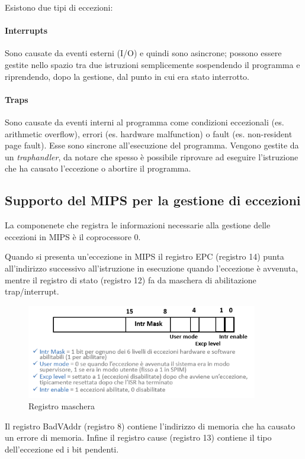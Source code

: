 \documentclass[class=book, crop=false, oneside]{standalone}
\begin{document}
Esistono due tipi di eccezioni:
\paragraph{Interrupts} Sono causate da eventi esterni (I/O) e quindi sono asincrone; possono essere gestite nello spazio tra due istruzioni semplicemente sospendendo il programma e riprendendo, dopo la gestione, dal punto in cui era stato interrotto.
\paragraph{Traps} Sono causate da eventi interni al programma come condizioni eccezionali (es. arithmetic overflow), errori (es. hardware malfunction) o fault (es. non-resident page fault).
Esse sono sincrone all’esecuzione del programma.
Vengono gestite da un \emph{traphandler}, da notare che spesso è possibile riprovare ad eseguire l’istruzione che ha causato l’eccezione o abortire il programma.

\subsection{Supporto del MIPS per la gestione di eccezioni}
La componenete che registra le informazioni necessarie alla gestione delle eccezioni in MIPS è il coprocessore 0.

Quando si presenta un'eccezione in MIPS il registro EPC (registro 14) punta all’indirizzo successivo all’istruzione in esecuzione quando l’eccezione è avvenuta, mentre il registro di stato (registro 12) fa da maschera di abilitazione trap/interrupt.

\begin{figure}[H]
	\centering
	\includegraphics[width=0.9\textwidth,keepaspectratio]{registro-maschera}
	\caption{Registro maschera}
\end{figure}

Il registro BadVAddr (registro 8) contiene l'indirizzo di memoria che ha causato un errore di memoria.
Infine il registro cause (registro 13) contiene il tipo dell’eccezione ed i bit pendenti.
\end{document}
